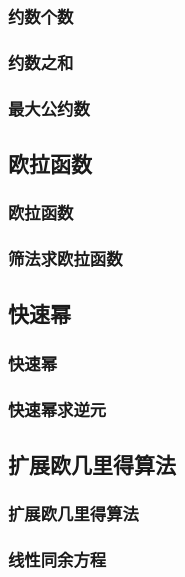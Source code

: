 \documentclass[10pt,a4paper]{article}
\begin{document}
\subsubsection{约数个数}

\subsubsection{约数之和}

\subsubsection{最大公约数}

\subsection{欧拉函数}
\subsubsection{欧拉函数}

\subsubsection{筛法求欧拉函数}

\subsection{快速幂}
\subsubsection{快速幂}

\subsubsection{快速幂求逆元}

\subsection{扩展欧几里得算法}
\subsubsection{扩展欧几里得算法}

\subsubsection{线性同余方程}

\end{document}
